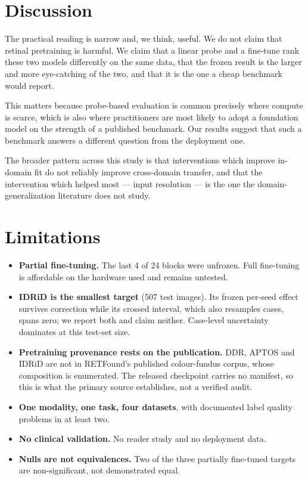 \documentclass[journal]{IEEEtran}
\begin{document}
\section{Discussion}
The practical reading is narrow and, we think, useful. We do not claim that
retinal pretraining is harmful. We claim that a linear probe and a fine-tune
rank these two models differently on the same data, that the frozen result is
the larger and more eye-catching of the two, and that it is the one a cheap
benchmark would report.

This matters because probe-based evaluation is common precisely where compute is
scarce, which is also where practitioners are most likely to adopt a foundation
model on the strength of a published benchmark. Our results suggest that such a
benchmark answers a different question from the deployment one.

The broader pattern across this study is that interventions which improve
in-domain fit do not reliably improve cross-domain transfer, and that the
intervention which helped most --- input resolution --- is the one the
domain-generalization literature does not study.

\section{Limitations}
\label{sec:limits}
\begin{itemize}
\item \textbf{Partial fine-tuning.} The last 4 of 24 blocks were unfrozen. Full
      fine-tuning is affordable on the hardware used and remains untested.
\item \textbf{IDRiD is the smallest target} (507 test images). Its frozen
      per-seed effect survives correction while its crossed interval, which
      also resamples cases, spans zero; we report both and claim neither.
      Case-level uncertainty dominates at this test-set size.
\item \textbf{Pretraining provenance rests on the publication.} DDR, APTOS
      and IDRiD are not in RETFound's published colour-fundus corpus, whose
      composition is enumerated. The released checkpoint carries no manifest,
      so this is what the primary source establishes, not a verified audit.
\item \textbf{One modality, one task, four datasets}, with documented label
      quality problems in at least two.
\item \textbf{No clinical validation.} No reader study and no deployment data.
\item \textbf{Nulls are not equivalences.} Two of the three partially fine-tuned
      targets are non-significant, not demonstrated equal.
\end{itemize}
\end{document}

